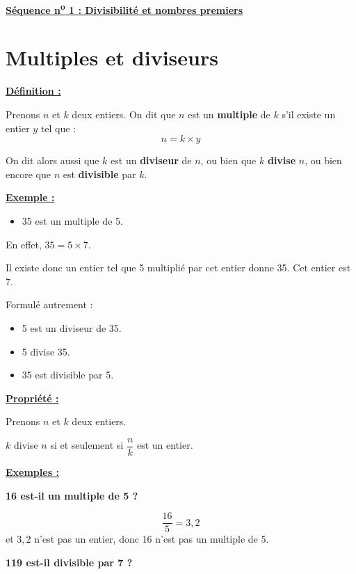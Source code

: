 \documentclass[13pt]{extarticle}
\newcommand{\blocTitre}[1]{%
  \vspace{1em}%
  \noindent\underline{\textbf{#1 :}}\par%
  \vspace{0.3em}%
}
\begin{document}
\begin{center}
  \Large\bfseries\underline{Séquence n\textsuperscript{o} 1 : Divisibilité et nombres premiers}
\end{center}

\vspace{1em}

\section{Multiples et diviseurs}

\blocTitre{Définition}

Prenons $n$ et $k$ deux entiers. On dit que $n$ est un \textbf{multiple} de $k$ s'il existe un entier $y$ tel que :
\[
n = k \times y
\]

On dit alors aussi que $k$ est un \textbf{diviseur} de $n$, ou bien que $k$ \textbf{divise} $n$, ou bien encore que $n$ est \textbf{divisible} par $k$.

\blocTitre{Exemple}

\begin{itemize}
  \item 35 est un multiple de 5.
\end{itemize}

En effet, $35 = 5 \times 7$.

Il existe donc un entier tel que 5 multiplié par cet entier donne 35. Cet entier est 7.

Formulé autrement :
\begin{itemize}
  \item 5 est un diviseur de 35.
  \item 5 divise 35.
  \item 35 est divisible par 5.
\end{itemize}


\blocTitre{Propriété}

Prenons $n$ et $k$ deux entiers.

$k$ divise $n$ si et seulement si $\dfrac{n}{k}$ est un entier.

\blocTitre{Exemples}

\textbf{16 est-il un multiple de 5 ?}

\[
\frac{16}{5} = 3{,}2
\]
et $3{,}2$ n'est pas un entier, donc 16 n'est pas un multiple de 5.

\textbf{119 est-il divisible par 7 ?}
\end{document}
